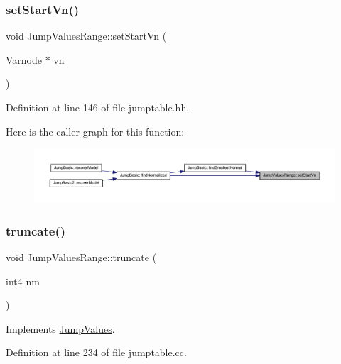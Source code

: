 \subsubsection{\texorpdfstring{setStartVn()}{setStartVn()}}
{\footnotesize\ttfamily void Jump\+Values\+Range\+::set\+Start\+Vn (\begin{DoxyParamCaption}\item[{\mbox{\hyperlink{class_varnode}{Varnode}} $\ast$}]{vn }\end{DoxyParamCaption})\hspace{0.3cm}{\ttfamily [inline]}}



Definition at line 146 of file jumptable.\+hh.

Here is the caller graph for this function\+:
\nopagebreak
\begin{figure}[H]
\begin{center}
\leavevmode
\includegraphics[width=350pt]{class_jump_values_range_a56c468c294cc0da0dadb756ef16d72ab_icgraph}
\end{center}
\end{figure}
\mbox{\label{class_jump_values_range_a7db1100f69820afdec9f6bfef09db8b1}} 
\subsubsection{\texorpdfstring{truncate()}{truncate()}}
{\footnotesize\ttfamily void Jump\+Values\+Range\+::truncate (\begin{DoxyParamCaption}\item[{int4}]{nm }\end{DoxyParamCaption})\hspace{0.3cm}{\ttfamily [virtual]}}



Implements \mbox{\hyperlink{class_jump_values_a8a7cbd3dad9ae70992f122c5da0b43ea}{Jump\+Values}}.



Definition at line 234 of file jumptable.\+cc.

